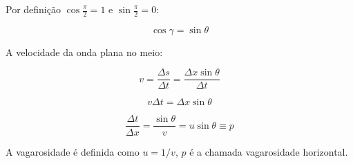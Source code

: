 \documentclass[a4paper, 12pt]{article}
\begin{document}
Por definição $\cos \frac{\pi}{2} = 1$ e $\sin \frac{\pi}{2} = 0$:

\begin{equation}
\label{eq:1.5}
\cos \gamma = \sin \theta
\end{equation}

A velocidade da onda plana no meio:

\begin{equation}
 \label{eq:1.6}
 v = \frac{\Delta s}{\Delta t} = \frac{\Delta x \sin \theta}{\Delta t}
\end{equation}

\begin{equation}
 \label{eq:1.7}
 v \Delta t = \Delta x \sin \theta
\end{equation}

\begin{equation}
 \label{eq:1.8}
 \frac{\Delta t}{\Delta x} = \frac{\sin \theta}{v} = u \sin \theta \equiv p
\end{equation}

A vagarosidade é definida como $u=1/v$, $p$ é a chamada vagarosidade horizontal.
\end{document}
